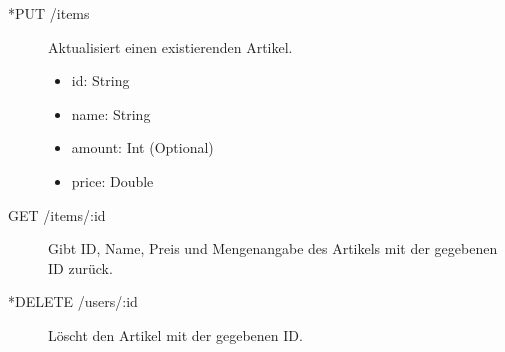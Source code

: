 \begin{appendix}
\begin{description}
	\item[*PUT /items] Aktualisiert einen existierenden Artikel.
	\begin{itemize}
		\item id: String
		\item name: String
		\item amount: Int (Optional)
		\item price: Double
	\end{itemize}
	
	\item[GET /items/:id] Gibt ID, Name, Preis und Mengenangabe des Artikels mit der gegebenen ID zurück.
	
	\item[*DELETE /users/:id] Löscht den Artikel mit der gegebenen ID.
\end{description}

\end{appendix}
